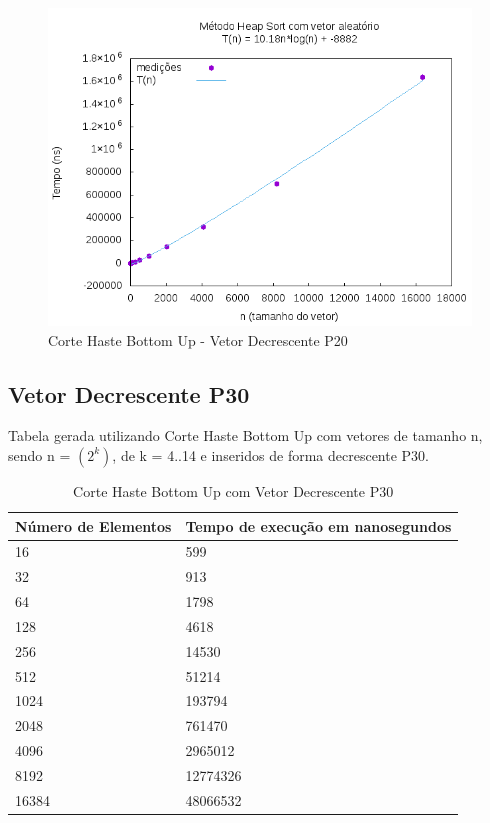 \documentclass[12pt,a4paper,twoside]{report}
\begin{document}
\begin{figure}[H]
    \centering
    \includegraphics[width=0.7\linewidth]{graficos/HeapSort/vIntAleatorio/vIntAleatorio.png}
  \caption{Corte Haste Bottom Up - Vetor Decrescente P20}
\end{figure}




\subsection{Vetor Decrescente P30}
Tabela gerada utilizando Corte Haste Bottom Up com vetores de tamanho n, sendo n = $(2^k)$, de k = 4..14 e inseridos de forma decrescente P30.
\begin{table}[H]
\centering
\caption{Corte Haste Bottom Up com Vetor Decrescente P30}
\label{my-label}
\begin{tabular}{|l|l|}
\hline
\multicolumn{1}{|c|}{\textbf{Número de Elementos}} & \multicolumn{1}{c|}{\textbf{Tempo de execução em nanosegundos}} \\ \hline
16 & 599 \\ \hline
32 & 913 \\ \hline
64 & 1798 \\ \hline
128 & 4618 \\ \hline
256 & 14530 \\ \hline
512 & 51214 \\ \hline
1024 & 193794 \\ \hline
2048 & 761470 \\ \hline
4096 & 2965012 \\ \hline
8192 & 12774326 \\ \hline
16384 & 48066532 \\ \hline
\end{tabular}
\end{table}
\end{document}
